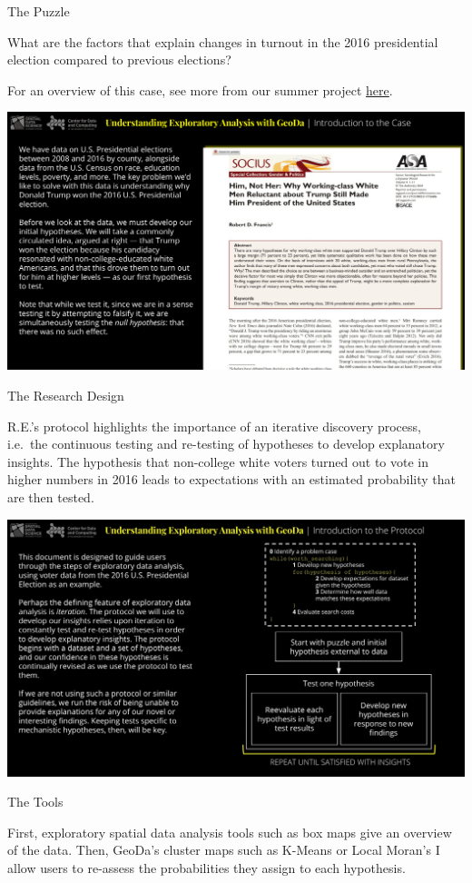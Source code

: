 \documentclass[
]{book}
\begin{document}
The Puzzle

What are the factors that explain changes in turnout in the 2016 presidential election compared to previous elections?

For an overview of this case, see more from our summer project \href{https://uchicago.box.com/s/5wu1l2zz8tbwlxm9frvruuicx6ogtw2b}{here}.

\includegraphics{images/elections2.png}

The Research Design

R.E.'s protocol highlights the importance of an iterative discovery process, i.e.~the continuous testing and re-testing of hypotheses to develop explanatory insights. The hypothesis that non-college white voters turned out to vote in higher numbers in 2016 leads to expectations with an estimated probability that are then tested.

\includegraphics{images/elections3.jpg}

The Tools

First, exploratory spatial data analysis tools such as box maps give an overview of the data. Then, GeoDa's cluster maps such as K-Means or Local Moran's I allow users to re-assess the probabilities they assign to each hypothesis.
\end{document}
